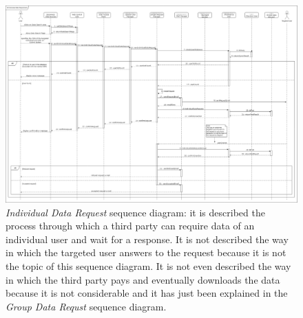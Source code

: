 \begin{figure}[H]
  \begin{center}
  	\includegraphics[width=\textwidth]{./img/sequence/individualDataRequest.png}
    \hspace{0.05\linewidth}
    \centering
    \caption{\textit{Individual Data Request} sequence diagram: it is described the process through which a third party can require data of an individual user and wait for a response. It is not described the way in which the targeted user answers to the request because it is not the topic of this sequence diagram. It is not even described the way in which the third party pays and eventually downloads the data because it is not considerable and it has just been explained in the \textit{Group Data Requst} sequence diagram.}
		\label{img:individualDataRequest}
    \end{center}
\end{figure}

